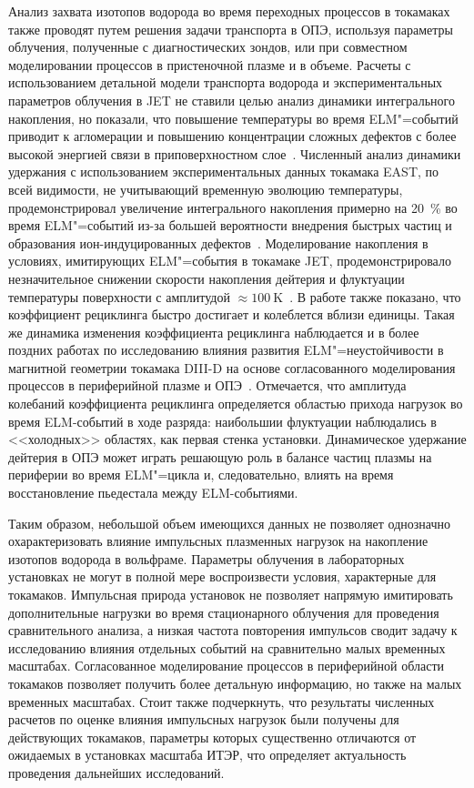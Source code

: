 Анализ захвата изотопов водорода во время переходных процессов в токамаках также проводят путем решения задачи транспорта в ОПЭ, используя параметры облучения, полученные с диагностических зондов, или при совместном моделировании процессов в пристеночной плазме и в объеме. Расчеты с использованием детальной модели транспорта водорода и экспериментальных параметров облучения в JET не ставили целью анализ динамики интегрального накопления, но показали, что повышение температуры во время ELM"=событий приводит к агломерации и повышению концентрации сложных дефектов с более высокой энергией связи в приповерхностном слое~\cite{Heinola2019}. Численный анализ динамики удержания с использованием экспериментальных данных токамака EAST, по всей видимости, не учитывающий временную эволюцию температуры, продемонстрировал увеличение интегрального накопления примерно на \SI{20}{\percent} во время ELM"=событий из-за большей вероятности внедрения быстрых частиц и образования ион-индуцированных дефектов~\cite{Sang2014}. Моделирование накопления в условиях, имитирующих ELM"=события в токамаке JET, продемонстрировало незначительное снижении скорости накопления дейтерия и флуктуации температуры поверхности с амплитудой \( \approx \SI{100}{\kelvin} \)~\cite{Schmid2016}. В работе также показано, что коэффициент рециклинга быстро достигает и колеблется вблизи единицы. Такая же динамика изменения коэффициента рециклинга наблюдается и в более поздних работах по исследованию влияния развития ELM"=неустойчивости в магнитной геометрии токамака DIII-D на основе согласованного моделирования процессов в периферийной плазме и ОПЭ~\cite{Smirnov2020,Lasa2024,Smirnov2024}. Отмечается, что амплитуда колебаний коэффициента рециклинга определяется областью прихода нагрузок во время ELM-событий в ходе разряда: наибольшии флуктуации наблюдались в <<холодных>> областях, как первая стенка установки. Динамическое удержание дейтерия в ОПЭ может играть решающую роль в балансе частиц плазмы на периферии во время ELM"=цикла и, следовательно, влиять на время восстановление пьедестала между ELM-событиями.

Таким образом, небольшой объем имеющихся данных не позволяет однозначно охарактеризовать влияние импульсных плазменных нагрузок на накопление изотопов водорода в вольфраме. Параметры облучения в лабораторных установках не могут в полной мере воспроизвести условия, характерные для токамаков. Импульсная природа установок не позволяет напрямую имитировать дополнительные нагрузки во время стационарного облучения для проведения сравнительного анализа, а низкая частота повторения импульсов сводит задачу к исследованию влияния отдельных событий на сравнительно малых временных масштабах. Согласованное моделирование процессов в периферийной области токамаков позволяет получить более детальную информацию, но также на малых временных масштабах. Стоит также подчеркнуть, что результаты численных расчетов по оценке влияния импульсных нагрузок были получены для действующих токамаков, параметры которых существенно отличаются от ожидаемых в установках масштаба ИТЭР, что определяет актуальность проведения дальнейших исследований.


